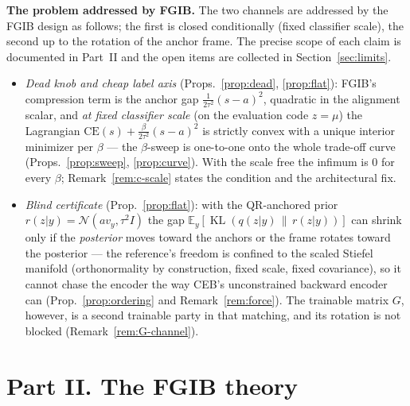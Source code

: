 \textbf{The problem addressed by FGIB.}
The two channels are addressed by the FGIB design as follows; the first is closed
conditionally (fixed classifier scale), the second up to the rotation of the anchor
frame. The precise scope of each claim is documented in Part~II and the open items are
collected in Section~\ref{sec:limits}.
\begin{itemize}
\item \emph{Dead knob and cheap label axis} (Props.~\ref{prop:dead}, \ref{prop:flat}):
FGIB's compression term is the anchor gap $\tfrac{1}{2\tau^2}(s-a)^2$, quadratic in the
alignment scalar, and \emph{at fixed classifier scale} (on the evaluation code $z = \mu$)
the Lagrangian
$\mathrm{CE}(s) + \tfrac{\beta}{2\tau^2}(s-a)^2$ is strictly convex with a unique interior
minimizer per $\beta$ --- the $\beta$-sweep is one-to-one onto the whole trade-off curve
(Props.~\ref{prop:sweep}, \ref{prop:curve}). With the scale free the infimum is $0$ for
every $\beta$; Remark~\ref{rem:c-scale} states the condition and the architectural fix.
\item \emph{Blind certificate} (Prop.~\ref{prop:flat}): with the QR-anchored prior
$r(z|y) = \mathcal{N}(a v_y, \tau^2 I)$ the gap
$\mathbb{E}_y[\operatorname{KL}(q(z|y)\,\|\,r(z|y))]$ can shrink only if the
\emph{posterior} moves toward the anchors or the frame rotates toward the posterior ---
the reference's freedom is confined to the scaled Stiefel manifold (orthonormality by
construction, fixed scale, fixed covariance), so it cannot chase the encoder the way
CEB's unconstrained backward encoder can (Prop.~\ref{prop:ordering} and
Remark~\ref{rem:force}). The trainable matrix $G$, however, is a second trainable party in that
matching, and its rotation is not blocked (Remark~\ref{rem:G-channel}).
\end{itemize}

\section*{Part II. The FGIB theory}

